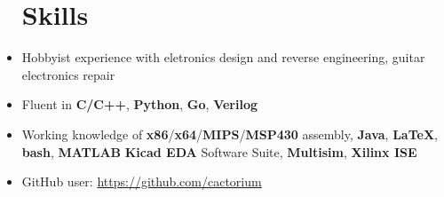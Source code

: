 \documentclass{my_resume}
\begin{document}
\begin{itemize}
\section{Skills}
    \item Hobbyist experience with eletronics design and reverse engineering, guitar electronics
        repair
    \item Fluent in \textbf{C/C++}, \textbf{Python}, \textbf{Go}, \textbf{Verilog}
	\item Working knowledge of \textbf{x86}/\textbf{x64}/\textbf{MIPS}/\textbf{MSP430} assembly,
            \textbf{Java}, \textbf{LaTeX}, \textbf{bash}, \textbf{MATLAB}
            \textbf{Kicad EDA} Software Suite, \textbf{Multisim}, \textbf{Xilinx ISE}
    \item GitHub user: \url{https://github.com/cactorium}
\end{itemize}
\end{document}
